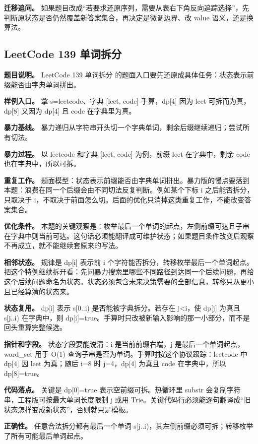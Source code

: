 \textbf{迁移追问。} 如果题目改成“若要求还原序列，需要从表右下角反向追踪选择”，先判断原状态是否仍然覆盖新答案集合，再决定是微调边界、改 value 语义，还是换算法。

\subsection{LeetCode 139 单词拆分}

\textbf{题目说明。} LeetCode 139 单词拆分 的题面入口要先还原成具体任务：状态表示前缀能否由字典单词拼出。

\textbf{样例入口。} 拿 s=leetcode、字典 [leet, code] 手算，dp[4] 因为 leet 可拆而为真，dp[8] 又因为 dp[4] 且 code 在字典里为真。

\textbf{暴力基线。} 暴力递归从字符串开头切一个字典单词，剩余后缀继续递归；尝试所有切法。

\textbf{暴力过程。} 以 leetcode 和字典 [leet, code] 为例，前缀 leet 在字典中，剩余 code 也在字典中，所以可拆。

\textbf{重复工作。} 题面模型：状态表示前缀能否由字典单词拼出。暴力版的慢点要落到本题：浪费在同一个后缀会由不同切法反复判断。例如某个下标 i 之后能否拆分，只取决于 i，不取决于前面怎么切。后面的优化只消掉这类重复工作，不能改变答案集合。

\textbf{优化条件。} 本题的关键观察是：枚举最后一个单词的起点，左侧前缀可达且子串在字典中则当前可达。这句话必须能翻译成可维护状态；如果题目条件改变后观察不再成立，就不能继续套原来的写法。

\textbf{相邻状态。} 规律是 dp[i] 表示前 i 个字符能否拆分，转移枚举最后一个单词起点。把这个特例继续拆开看：先问暴力搜索里哪些不同路径到达同一个后续问题，再给这个后续问题命名为状态。状态必须包含未来决策需要的全部信息，转移只从更小且已经算清的状态来。

\textbf{状态复用。} dp[i] 表示 s[0..i) 是否能被字典拆分。若存在 j<i，使 dp[j] 为真且 s[j..i) 在字典中，则 dp[i]=true。手算时只改被新输入影响的那一小部分，而不是回头重算完整候选。

\textbf{指针和字段。} 状态字段要能说清：i 是当前前缀右端，j 是最后一个单词起点，word\_set 用于 O(1) 查询子串是否为单词。手算时按这个协议跟踪：leetcode 中 dp[4] 因 leet 为真；随后 i=8 时 j=4，dp[4] 为真且 code 在字典中，所以 dp[8]=true。

\textbf{代码落点。} 关键是 dp[0]=true 表示空前缀可拆。热循环里 substr 会复制字符串，工程版可按最大单词长度限制 j 或用 Trie。关键代码行必须能逐句翻译成“旧状态怎样变成新状态”，否则就只是模板。

\textbf{正确性。} 任意合法拆分都有最后一个单词 s[j..i)，其左侧前缀必须可拆；转移枚举了所有可能最后单词起点。

